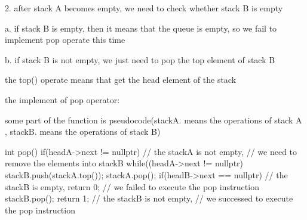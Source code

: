 \begin{parts}
\begin{solution}
		
		2. after stack A becomes empty, we need to check whether stack B is empty
			
			a. if stack B is empty, then it means that the queue is empty, so we fail to implement pop operate this time
			
			b. if stack B is not empty, we just need to pop the top element of stack B

		the top() operate means that get the head element of the stack
		
		the implement of pop operator:
		
		some part of the function is pseudocode(stackA. means the operations of stack A , stackB. means the operations of stack B)
		
		\begin{cpp}
int pop()
{
  if(headA->next != nullptr)  // the stackA is not empty, 
  {		    // we need to remove the elements into stackB
    while((headA->next != nullptr)
    {
      stackB.push(stackA.top());
      stackA.pop();
    }
  }
  if(headB->next == nullptr)  // the stackB is empty,
    return 0;   // we failed to execute the pop instruction
  stackB.pop();
  return 1;       // the stackB is not empty, 
	        // we successed to execute the pop instruction
}
		\end{cpp}
	\end{solution}
\end{parts}